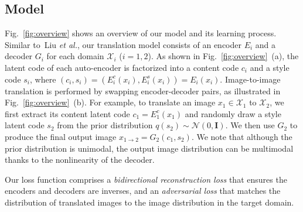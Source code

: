 \documentclass[runningheads]{llncs}
\def\etal{\emph{et al.}\xspace}
\begin{document}
	\subsection{Model}
	\label{sec:model}	
	Fig.~\ref{fig:overview} shows an overview of our model and its learning process. Similar to~Liu \etal\cite{liu2017unsupervised}, our translation model consists of an encoder $E_{i}$ and a decoder $G_{i}$  for each domain $\mathcal{X}_{i}$ ($i=1,2$). As shown in Fig.~\ref{fig:overview}~(a), the latent code of each auto-encoder is factorized into a content code $c_{i}$ and a style code $s_{i}$, where $(c_{i}, s_{i}) = (E_{i}^{c}(x_{i}), E_{i}^{s}(x_{i})) = E_{i}(x_{i})$. Image-to-image translation is performed by swapping encoder-decoder pairs, as illustrated in Fig.~\ref{fig:overview}~(b). For example, to translate an image $x_{1}\in \mathcal{X}_{1}$ to $\mathcal{X}_{2}$, we first extract its content latent code $c_{1} = E^{c}_{1}(x_{1})$ and randomly draw a style latent code $s_{2}$ from the prior distribution $q(s_{2})\sim \mathcal{N}(0, \mathbf{I})$. We then use $G_{2}$ to produce the final output image $x_{1\rightarrow 2} = G_{2}(c_{1}, s_{2})$. We note that although the prior distribution is unimodal, the output image distribution can be multimodal thanks to the nonlinearity of the decoder.
	
	Our loss function comprises a \textit{bidirectional reconstruction loss} that ensures the encoders and decoders are inverses, and an \textit{adversarial loss} that matches the distribution of translated images to the image distribution in the target domain.
	
\end{document}
